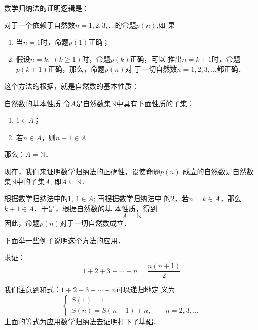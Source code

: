 数学归纳法的证明逻辑是：

对于一个依赖于自然数$n=1,2,3,\ldots$的命题$p(n)$,如
果
\begin{enumerate}
    \item 当$n=1$时，命题$p(1)$正确；
    \item 假设$n=k,\; (k\ge 1)$时，命题$p(k)$正确，可以
推出$n=k+1$时，命题$p(k+1)$正确，那么，命题$p(n)$对
于一切自然数$n=1,2,3,\ldots$都正确．
\end{enumerate}

这个方法的根据，就是自然数的基本性质：

\begin{blk}{自然数的基本性质}
    令$A$是自然数集$\mathbb{N}$中具有下面性质的子集：
\begin{enumerate}
    \item $1\in A$；
    \item 若$n\in A$，则$n+1\in A$
\end{enumerate}
那么：$A=\mathbb{N}$．
\end{blk}

现在，我们来证明数学归纳法的正确性，设使命题$p(n)$
成立的自然数是自然数集$\mathbb{N}$中的子集$A$, 即$A\subseteq \mathbb{N}$．

根据数学归纳法中的1, $1\in A$; 再根据数学归纳法中
的2，若$n=k\in A$，那么$k+1\in A$．于是，根据自然数的基
本性质，得到
$$A=\mathbb{N}$$
因此，命题$p(n)$对于一切自然数成立．

下面举一些例子说明这个方法的应用．

\begin{example}
    求证：
    \begin{equation}
        1+2+3+\cdots+n=\frac{n(n+1)}{2}
    \end{equation}
\end{example}

\begin{analyze}
    我们注意到和式：$ 1+2+3+\cdots+n$可以递归地定
义为
\[\begin{cases}
    S(1)=1\\
    S(n)=S(n-1)+n,\qquad n=2,3,\ldots
\end{cases}\]
上面的等式为应用数学归纳法去证明打下了基础．
\end{analyze}


